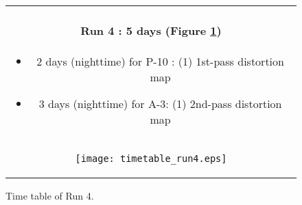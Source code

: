 \begin{figure}[!ht]
\begin{center}
\begin{tabular}{c}
\begin{minipage}{0.95\hsize}
\paragraph{Run 4 : 5 days  (Figure \ref{fig:run4})}
	\begin{itemize}
	\item 2 days (nighttime) for P-10 : 
	(1) 1st-pass distortion map
	\item 3 days (nighttime) for A-3: 
	(1) 2nd-pass distortion map
	\end{itemize}
\end{minipage} \\
\begin{minipage}{0.8\hsize}
	\begin{center}
	\vspace*{5mm}
	\texttt{[image: timetable\_run4.eps]}
	\end{center}
	\vspace*{-5mm}
	\caption{Time table of Run 4.}
	\label{fig:run4}
\end{minipage}
\end{tabular}
\end{center}
\end{figure}


